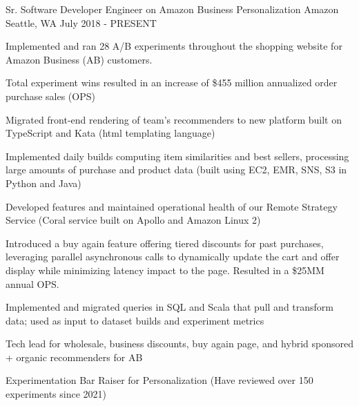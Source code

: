 

\begin{cventries}

  \cventry
    {Sr. Software Developer Engineer on Amazon Business Personalization} %
    {Amazon} %
    {Seattle, WA} %
    {July 2018 - PRESENT} %
    {
      \begin{cvitems} %
        \item {Implemented and ran 28 A/B experiments throughout the shopping website for Amazon Business (AB) customers.}
        \item {Total experiment wins resulted in an increase of \$455 million annualized order purchase sales (OPS)}
        \item {Migrated front-end rendering of team's recommenders to new platform built on TypeScript and Kata (html templating language)}
        \item {Implemented daily builds computing item similarities and best sellers, processing large amounts of purchase and product data (built using EC2, EMR, SNS, S3 in Python and Java)}
        \item {Developed features and maintained operational health of our Remote Strategy Service (Coral service built on Apollo and Amazon Linux 2)}
        \item {Introduced a buy again feature offering tiered discounts for past purchases, leveraging parallel asynchronous calls to dynamically update the cart and offer display while minimizing latency impact to the page. Resulted in a \$25MM annual OPS.}
        \item {Implemented and migrated queries in SQL and Scala that pull and transform data; used as input to dataset builds and experiment metrics }
        \item {Tech lead for wholesale, business discounts, buy again page, and hybrid sponsored + organic recommenders for AB}
        \item {Experimentation Bar Raiser for Personalization (Have reviewed over 150 experiments since  2021)}
      \end{cvitems}
    }
    

\end{cventries}
